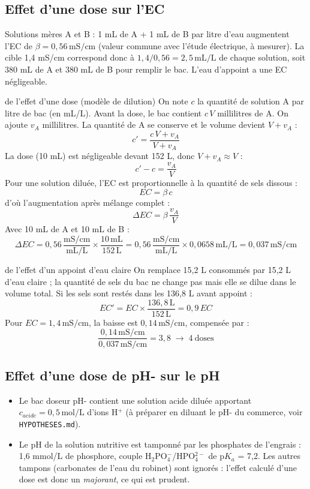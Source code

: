 \documentclass[11pt,a4paper]{article}
\newcommand{\U}[1]{\,\mathrm{#1}}
\begin{document}
\subsection{Effet d'une dose sur l'EC}

\begin{hypo}
Solutions mères A et B : 1 mL de A + 1 mL de B par litre d'eau augmentent l'EC de $\beta = 0{,}56\U{mS/cm}$ (valeur commune avec l'étude électrique, à mesurer). La cible 1,4 mS/cm correspond donc à $1{,}4/0{,}56 = 2{,}5\U{mL/L}$ de chaque solution, soit 380 mL de A et 380 mL de B pour remplir le bac. L'eau d'appoint a une EC négligeable.
\end{hypo}

\begin{calcul}{de l'effet d'une dose (modèle de dilution)}
On note $c$ la quantité de solution A par litre de bac (en mL/L). Avant la dose, le bac contient $c\,V$ millilitres de A. On ajoute $v_A$ millilitres. La quantité de A se conserve et le volume devient $V + v_A$ :
\[ c' = \frac{c\,V + v_A}{V + v_A} \]
La dose (10 mL) est négligeable devant 152 L, donc $V + v_A \approx V$ :
\[ c' - c = \frac{v_A}{V} \]
Pour une solution diluée, l'EC est proportionnelle à la quantité de sels dissous :
\[ EC = \beta\,c \]
d'où l'augmentation après mélange complet :
\[ \Delta EC = \beta\,\frac{v_A}{V} \]
Avec 10 mL de A et 10 mL de B :
\[ \Delta EC = 0{,}56\U{\frac{mS/cm}{mL/L}}\times\frac{10\U{mL}}{152\U{L}} = 0{,}56\U{\frac{mS/cm}{mL/L}}\times0{,}0658\U{mL/L} = 0{,}037\U{mS/cm} \]
\end{calcul}

\begin{calcul}{de l'effet d'un appoint d'eau claire}
On remplace 15,2 L consommés par 15,2 L d'eau claire ; la quantité de sels du bac ne change pas mais elle se dilue dans le volume total. Si les sels sont restés dans les 136,8 L avant appoint :
\[ EC' = EC\times\frac{136{,}8\U{L}}{152\U{L}} = 0{,}9\,EC \]
Pour $EC = 1{,}4\U{mS/cm}$, la baisse est $0{,}14\U{mS/cm}$, compensée par :
\[ \frac{0{,}14\U{mS/cm}}{0{,}037\U{mS/cm}} = 3{,}8 \;\to\; 4\ \text{doses} \]
\end{calcul}

\subsection{Effet d'une dose de pH- sur le pH}

\begin{hypo}
\begin{itemize}
  \item Le bac doseur pH- contient une solution acide diluée apportant $c_{acide} = 0{,}5\U{mol/L}$ d'ions H$^+$ (à préparer en diluant le pH- du commerce, voir \texttt{HYPOTHESES.md}).
  \item Le pH de la solution nutritive est tamponné par les phosphates de l'engrais : 1,6 mmol/L de phosphore, couple H$_2$PO$_4^-$/HPO$_4^{2-}$ de p$K_a$ = 7,2. Les autres tampons (carbonates de l'eau du robinet) sont ignorés : l'effet calculé d'une dose est donc un \emph{majorant}, ce qui est prudent.
\end{itemize}
\end{hypo}
\end{document}
